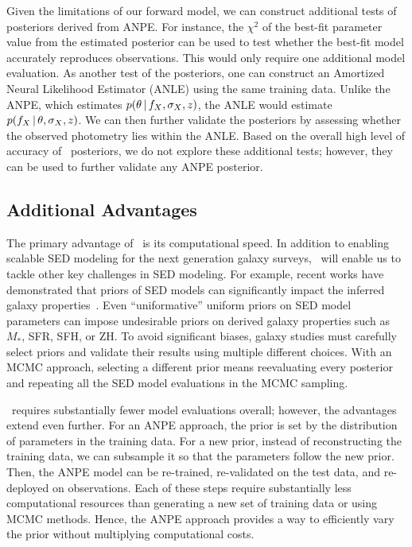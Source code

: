 Given the limitations of our forward model, we can construct additional tests
of posteriors derived from ANPE. 
For instance, the $\chi^2$ of the best-fit parameter value from the 
estimated posterior can be used to test whether the best-fit model 
accurately reproduces observations.
This would only require one additional model evaluation. 
As another test of the posteriors, one can construct an Amortized Neural
Likelihood Estimator (ANLE) using the same training data. 
Unlike the ANPE, which estimates $p(\theta\,|\, f_X, \sigma_X, z)$, the ANLE
would estimate $p(f_X \,|\, \theta, \sigma_X, z)$.
We can then further validate the posteriors by assessing whether the observed
photometry lies within the ANLE. 
Based on the overall high level of accuracy of \sedflow~posteriors, we do not
explore these additional tests; however, they can be used to further validate
any ANPE posterior. 

\subsection{Additional Advantages} 
The primary advantage of \sedflow~is its computational speed. 
In addition to enabling scalable SED modeling for the next generation galaxy
surveys, \sedflow~will enable us to tackle other key challenges in SED
modeling. 
For example, recent works have demonstrated that priors of SED models can
significantly impact the inferred galaxy properties~\citep{carnall2018,
leja2019, hahn2022}. 
Even ``uniformative'' uniform priors on SED model parameters can impose
undesirable priors on derived galaxy properties such as $M_*$, SFR, SFH, or
ZH.
To avoid significant biases, galaxy studies must carefully select priors and
validate their results using multiple different choices. 
With an MCMC approach, selecting a different prior means reevaluating every
posterior and repeating all the SED model evaluations in the MCMC sampling.  

\sedflow~requires substantially fewer model evaluations overall; however, the
advantages extend even further. 
For an ANPE approach, the prior is set by the distribution of parameters in the
training data. 
For a new prior, instead of reconstructing the training data, we can subsample
it so that the parameters follow the new prior. 
Then, the ANPE model can be re-trained, re-validated on the test data, and
re-deployed on observations.
Each of these steps require substantially less computational resources than
generating a new set of training data or using MCMC methods. 
Hence, the ANPE approach provides a way to efficiently vary the prior without
multiplying computational costs.

